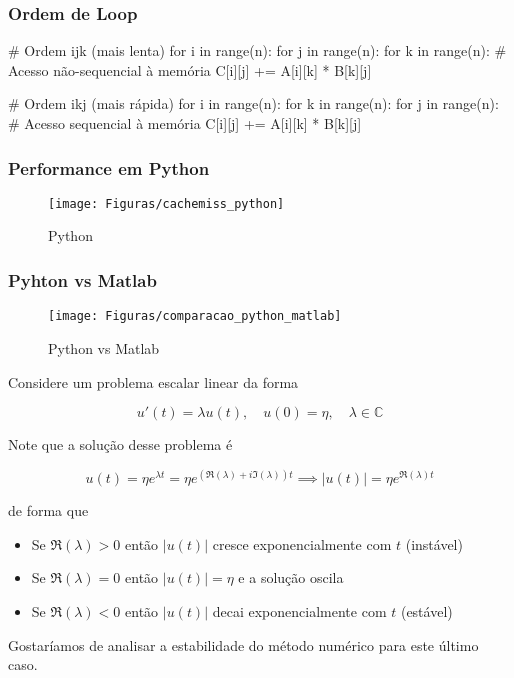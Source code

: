 \documentclass[utf8]{beamer}
\theoremstyle{definition}
\begin{document}
\begin{frame}[fragile]
	\frametitle{Ordem de Loop}
	\begin{semiverbatim}
		# Ordem ijk (mais lenta)
		for i in range(n):
		   for j in range(n):
		      for k in range(n):  # Acesso não-sequencial à memória
		        C[i][j] += A[i][k] * B[k][j]
		
		# Ordem ikj (mais rápida)
		for i in range(n):
		   for k in range(n):
		      for j in range(n):  # Acesso sequencial à memória
		         C[i][j] += A[i][k] * B[k][j]
	\end{semiverbatim}
\end{frame}

\begin{frame}
	\frametitle{Performance em Python}
	\begin{figure}[H]
		\centering
		\texttt{[image: Figuras/cachemiss\_python]}
		\caption{Python}
		\label{fig:performace_python}
	\end{figure}
\end{frame}

\begin{frame}
		\frametitle{Pyhton vs Matlab}
	\begin{figure}[H]
		\centering
		\texttt{[image: Figuras/comparacao\_python\_matlab]}
		\caption{Python vs Matlab}
		\label{fig:performace_python_vs_matlab}
	\end{figure}
\end{frame}

\begin{frame}{}
		
		Considere um problema escalar linear da forma
		
		\[
		u'(t) = \lambda u(t), \quad u(0) = \eta, \quad \lambda \in \mathbb{C}
		\]
		
		Note que a solução desse problema é
		
		\[
		u(t) = \eta e^{\lambda t} = \eta e^{(\Re(\lambda) + i\Im(\lambda))t} \implies |u(t)| = \eta e^{\Re(\lambda)t}
		\]
		
		de forma que
		
		\begin{itemize}
			\item Se \(\Re(\lambda) > 0\) então \(|u(t)|\) cresce exponencialmente com \(t\) (instável)
			\item Se \(\Re(\lambda) = 0\) então \(|u(t)| = \eta\) e a solução oscila
			\item Se \(\Re(\lambda) < 0\) então \(|u(t)|\) decai exponencialmente com \(t\) (estável)
		\end{itemize}
		
		Gostaríamos de analisar a estabilidade do método numérico para este último caso.
	
\end{frame}
\end{document}
